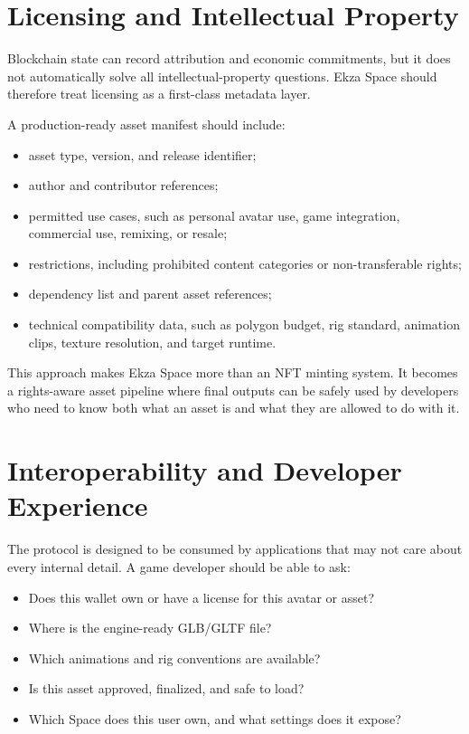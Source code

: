 \documentclass[10pt,twocolumn]{article}
\begin{document}
\section{Licensing and Intellectual Property}
Blockchain state can record attribution and economic commitments, but it does not automatically solve all intellectual-property questions. Ekza Space should therefore treat licensing as a first-class metadata layer.

A production-ready asset manifest should include:
\begin{itemize}
    \item asset type, version, and release identifier;
    \item author and contributor references;
    \item permitted use cases, such as personal avatar use, game integration, commercial use, remixing, or resale;
    \item restrictions, including prohibited content categories or non-transferable rights;
    \item dependency list and parent asset references;
    \item technical compatibility data, such as polygon budget, rig standard, animation clips, texture resolution, and target runtime.
\end{itemize}

This approach makes Ekza Space more than an NFT minting system. It becomes a rights-aware asset pipeline where final outputs can be safely used by developers who need to know both what an asset is and what they are allowed to do with it.

\section{Interoperability and Developer Experience}
The protocol is designed to be consumed by applications that may not care about every internal detail. A game developer should be able to ask:
\begin{itemize}
    \item Does this wallet own or have a license for this avatar or asset?
    \item Where is the engine-ready GLB/GLTF file?
    \item Which animations and rig conventions are available?
    \item Is this asset approved, finalized, and safe to load?
    \item Which Space does this user own, and what settings does it expose?
\end{itemize}
\end{document}

